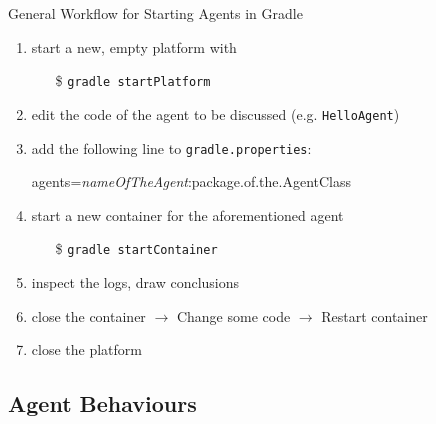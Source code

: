 \documentclass{beamer}\mode<presentation>{\usetheme{AMSCesenaPurpleAndGold}}
\begin{document}
\begin{frame}{General Workflow for Starting Agents in Gradle}

    \begin{enumerate}
        \item start a new, empty platform with
        \begin{itemize}
            \item[\$] \texttt{gradle startPlatform}
        \end{itemize}

        \vfill

        \item edit the code of the agent to be discussed (e.g. \texttt{HelloAgent})

        \vfill

        \item add the following line to \texttt{gradle.properties}:
        \begin{center}\ttfamily
            \alert{agents}=\textit{nameOfTheAgent}:package.of.the.AgentClass
        \end{center}

        \vfill

        \item start a new container for the aforementioned agent
        \begin{itemize}
            \item[\$] \texttt{gradle startContainer}
        \end{itemize}

        \vfill

        \item inspect the logs, draw conclusions

        \vfill

        \item close the container $\rightarrow$ Change some code $\rightarrow$ Restart container

        \vfill

        \item close the platform

    \end{enumerate}

\end{frame}

\subsection{Agent Behaviours}
\end{document}
